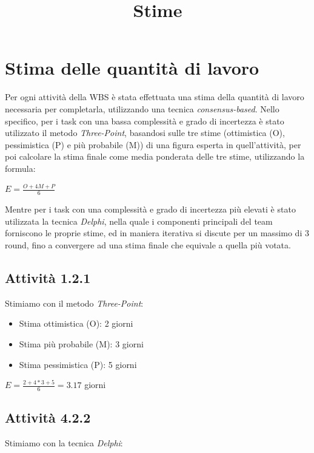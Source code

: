 \documentclass[a4paper,12pt]{article}
\title{\textbf{Stime}}
\author{}
\date{}
\begin{document}
\maketitle
\tableofcontents

\newpage

\section{Stima delle quantità di lavoro}
Per ogni attività della WBS è stata effettuata una stima della quantità di lavoro necessaria per completarla,
utilizzando una tecnica \textit{consensus-based}. Nello specifico, per i task con una bassa complessità e grado di
incertezza è stato utilizzato il metodo \textit{Three-Point}, basandosi sulle tre stime (ottimistica (O), pessimistica
(P) e più probabile (M)) di una figura esperta in quell'attività, per poi calcolare la stima finale come media
ponderata delle tre stime, utilizzando la formula:
\begin{center}
    $E = \frac{O + 4M + P}{6}$
\end{center}
Mentre per i task con una complessità e grado di incertezza più elevati è stato utilizzata la tecnica \textit{Delphi},
nella quale i componenti principali del team forniscono le proprie stime, ed in maniera iterativa si discute per un
massimo di 3 round, fino a convergere ad una stima finale che equivale a quella più votata.

\subsection{Attività 1.2.1}
Stimiamo con il metodo \textit{Three-Point}:
\begin{itemize}
    \item Stima ottimistica (O): 2 giorni
    \item Stima più probabile (M): 3 giorni
    \item Stima pessimistica (P): 5 giorni
\end{itemize}
\begin{center}
    $E = \frac{2 + 4*3 + 5}{6} = 3.17$ giorni
\end{center}

\subsection{Attività 4.2.2}
Stimiamo con la tecnica \textit{Delphi}:
\end{document}
